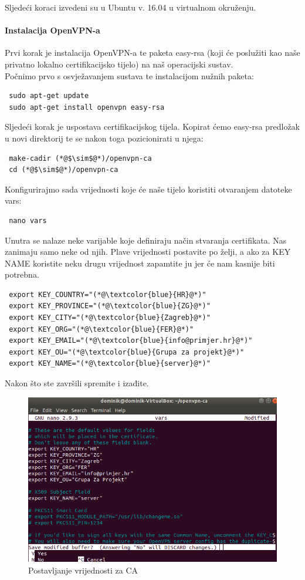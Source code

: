  Sljedeći koraci izvedeni su u Ubuntu v. 16.04 u virtualnom okruženju.
 
 \bigbreak
 \paragraph*{Instalacija OpenVPN-a}
 \hfill \smallbreak
 Prvi korak je instalacija OpenVPN-a te paketa easy-rsa (koji će poslužiti kao naše privatno lokalno certifikacijsko tijelo) na naš operacijski sustav. \\
 Počnimo prvo s osvježavanjem sustava te instalacijom nužnih paketa:
\begin{lstlisting}
 sudo apt-get update
 sudo apt-get install openvpn easy-rsa
\end{lstlisting}
 Sljedeći korak je uspostava certifikacijskog tijela. Kopirat ćemo easy-rsa predložak u novi direktorij te se nakon toga pozicionirati u njega:
\begin{lstlisting}
 make-cadir (*@$\sim$@*)/openvpn-ca
 cd (*@$\sim$@*)/openvpn-ca
\end{lstlisting}
Konfigurirajmo sada vrijednosti koje će naše tijelo koristiti otvaranjem datoteke vars:
\begin{lstlisting}
 nano vars
\end{lstlisting}
Unutra se nalaze neke varijable koje definiraju način stvaranja certifikata. Nas zanimaju samo neke od njih. Plave vrijednosti postavite po želji, a ako za KEY NAME koristite neku drugu vrijednost zapamtite ju jer će nam kasnije biti potrebna.
\begin{lstlisting}
 export KEY_COUNTRY="(*@\textcolor{blue}{HR}@*)"
 export KEY_PROVINCE="(*@\textcolor{blue}{ZG}@*)"
 export KEY_CITY="(*@\textcolor{blue}{Zagreb}@*)"
 export KEY_ORG="(*@\textcolor{blue}{FER}@*)"
 export KEY_EMAIL="(*@\textcolor{blue}{info@primjer.hr}@*)"
 export KEY_OU="(*@\textcolor{blue}{Grupa za projekt}@*)"
 export KEY_NAME="(*@\textcolor{blue}{server}@*)"
\end{lstlisting}
 Nakon što ste završili spremite i izađite. 

 \begin{figure}[h]
 	\centering
 	\includegraphics[width=0.7\linewidth]{"slike/OpenVPN/Screenshot from 2018-12-14 18-30-43"}
 	\caption[Postavljanje vrijednosti za certifikacijsko tijelo]{Postavljanje vrijednosti za CA}
 	\label{fig:screenshot-from-2018-12-14-18-30-43}
 \end{figure}
 
